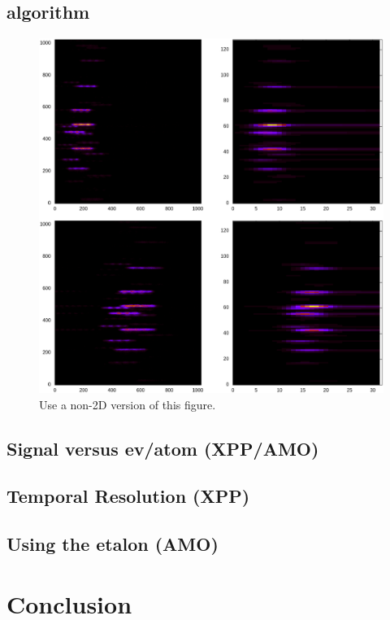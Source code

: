 \documentclass{article}
\newlength{\figwidth}
\begin{document}
\subsection{algorithm}
\begin{figure}
\centerline{\includegraphics[width=.5\figwidth]{plotting.ip_method_exp.eps}}
\caption{\label{fig::ip_mthod}Use a non-2D version of this figure.}
\end{figure}
\subsection{Signal versus ev/atom (XPP/AMO)}

\subsection{Temporal Resolution (XPP)}
\subsection{Using the etalon (AMO)}

\section{Conclusion}



\end{document}
